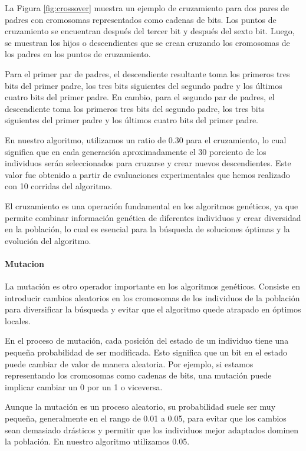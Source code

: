 La Figura \ref{fig:crossover} muestra un ejemplo de cruzamiento para dos pares de padres con cromosomas representados como cadenas de bits. Los puntos de cruzamiento se encuentran después del tercer bit y después del sexto bit. Luego, se muestran los hijos o descendientes que se crean cruzando los cromosomas de los padres en los puntos de cruzamiento.

Para el primer par de padres, el descendiente resultante toma los primeros tres bits del primer padre, los tres bits siguientes del segundo padre y los últimos cuatro bits del primer padre. En cambio, para el segundo par de padres, el descendiente toma los primeros tres bits del segundo padre, los tres bits siguientes del primer padre y los últimos cuatro bits del primer padre.

En nuestro algoritmo, utilizamos un ratio de 0.30 para el cruzamiento, lo cual significa que en cada generación aproximadamente el 30 porciento de los individuos serán seleccionados para cruzarse y crear nuevos descendientes. Este valor fue obtenido a partir de evaluaciones experimentales que hemos realizado con 10 corridas del algoritmo.

El cruzamiento es una operación fundamental en los algoritmos genéticos, ya que permite combinar información genética de diferentes individuos y crear diversidad en la población, lo cual es esencial para la búsqueda de soluciones óptimas y la evolución del algoritmo.


\paragraph{Mutacion}




La mutación es otro operador importante en los algoritmos genéticos. Consiste en introducir cambios aleatorios en los cromosomas de los individuos de la población para diversificar la búsqueda y evitar que el algoritmo quede atrapado en óptimos locales.

En el proceso de mutación, cada posición del estado de un individuo tiene una pequeña probabilidad de ser modificada. Esto significa que un bit en el estado puede cambiar de valor de manera aleatoria. Por ejemplo, si estamos representando los cromosomas como cadenas de bits, una mutación puede implicar cambiar un 0 por un 1 o viceversa.

Aunque la mutación es un proceso aleatorio, su probabilidad suele ser muy pequeña, generalmente en el rango de 0.01 a 0.05, para evitar que los cambios sean demasiado drásticos y permitir que los individuos mejor adaptados dominen la población. En nuestro algoritmo utilizamos 0.05.





